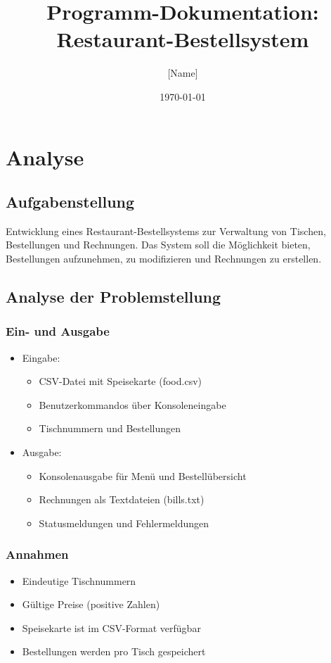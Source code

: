 \documentclass[a4paper,11pt]{article}
\title{Programm-Dokumentation: Restaurant-Bestellsystem}
\author{[Name]}
\date{\today}
\begin{document}
\maketitle

\section{Analyse}

\subsection{Aufgabenstellung}
Entwicklung eines Restaurant-Bestellsystems zur Verwaltung von Tischen, Bestellungen und Rechnungen. Das System soll die Möglichkeit bieten, Bestellungen aufzunehmen, zu modifizieren und Rechnungen zu erstellen.

\subsection{Analyse der Problemstellung}
\subsubsection{Ein- und Ausgabe}
\begin{itemize}
    \item Eingabe:
    \begin{itemize}
        \item CSV-Datei mit Speisekarte (food.csv)
        \item Benutzerkommandos über Konsoleneingabe
        \item Tischnummern und Bestellungen
    \end{itemize}

    \item Ausgabe:
    \begin{itemize}
        \item Konsolenausgabe für Menü und Bestellübersicht
        \item Rechnungen als Textdateien (bills.txt)
        \item Statusmeldungen und Fehlermeldungen
    \end{itemize}
\end{itemize}

\subsubsection{Annahmen}
\begin{itemize}
    \item Eindeutige Tischnummern
    \item Gültige Preise (positive Zahlen)
    \item Speisekarte ist im CSV-Format verfügbar
    \item Bestellungen werden pro Tisch gespeichert
\end{itemize}
\end{document}
